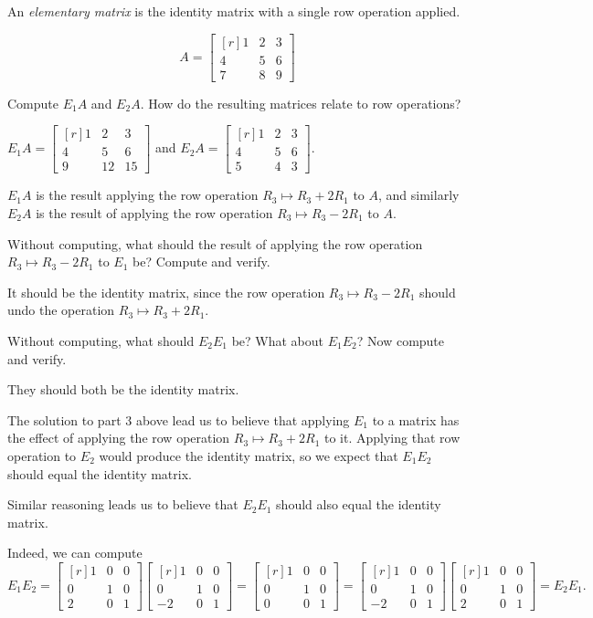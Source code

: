 \documentclass{problemset}
\newcommand{\mat}[1]{\begin{bmatrix*}[r]#1\end{bmatrix*}}
\begin{document}
	\begin{definition}
	An \emph{elementary matrix} is the identity matrix with a single row operation applied.
	\end{definition}

	\[
		A=\mat{1&2&3\\4&5&6\\7&8&9}
	\]
	\begin{parts}[resume]
		\item Compute $E_1A$ and $E_2A$. How do the resulting matrices relate to row
		operations?
			\begin{solution}
				$E_1A=\mat{1&2&3\\4&5&6\\9&12&15}$ and $E_2A=\mat{1&2&3\\4&5&6\\5&4&3}$.

				$E_1A$ is the result applying the row operation $R_3\mapsto R_3+2R_1$
				to $A$, and similarly $E_2A$ is the result of applying the row
				operation $R_3\mapsto R_3-2R_1$ to $A$.
			\end{solution}
		\item Without computing, what should the result of applying the row
		operation $R_3\mapsto R_3-2R_1$ to $E_1$ be? Compute and verify.
			\begin{solution}
				It should be the identity matrix, since the row operation
				$R_3\mapsto R_3-2R_1$ should undo the operation $R_3\mapsto R_3+2R_1$.
			\end{solution}
		\item Without computing, what should $E_2E_1$ be? What about $E_1E_2$?
		Now compute and verify.
			\begin{solution}
				They should both be the identity matrix.

				The solution to part 3 above lead us to believe that applying $E_1$
				to a matrix has the effect of applying the row operation $R_3\mapsto R_3+2R_1$
				to it. Applying that row operation to $E_2$ would produce the
				identity matrix, so we expect that $E_1E_2$ should equal the
				identity matrix.

				Similar reasoning leads us to believe that $E_2E_1$ should also
				equal the identity matrix.

				Indeed, we can compute
				\[
					E_1E_2
					=\mat{1&0&0\\0&1&0\\2&0&1}\mat{1&0&0\\0&1&0\\-2&0&1}
					=\mat{1&0&0\\0&1&0\\0&0&1}
					=\mat{1&0&0\\0&1&0\\-2&0&1}\mat{1&0&0\\0&1&0\\2&0&1}
					=E_2E_1.
				\]
			\end{solution}
	\end{parts}
\end{document}
